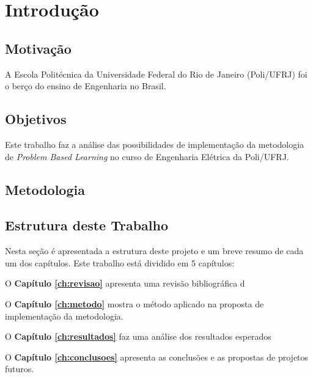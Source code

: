 \chapter{Introdução} \label{ch:intro}



	\section{Motivação}
	
		A Escola Politécnica  da Universidade Federal do Rio de Janeiro  (Poli/UFRJ) foi o berço do ensino de Engenharia no Brasil. 
		
	\section{Objetivos}
	
		Este trabalho faz a análise das possibilidades de implementação da metodologia de \textit{Problem Based Learning} no curso de Engenharia Elétrica da Poli/UFRJ.
		
	\section{Metodologia}
		
	\section{Estrutura deste Trabalho}
	
		Nesta seção é apresentada a estrutura deste projeto e um breve resumo de cada um dos capítulos. Este trabalho está dividido em 5 capítulos:
		
		O \textbf{Capítulo \ref{ch:revisao}} apresenta uma revisão bibliográfica d
		
		O \textbf{Capítulo \ref{ch:metodo}} mostra o método aplicado na proposta de implementação da metodologia.
		
		O \textbf{Capítulo \ref{ch:resultados}} faz uma análise dos resultados esperados 
		
		O \textbf{Capítulo \ref{ch:conclusoes}} apresenta as conclusões e as propostas de projetos futuros.
		
